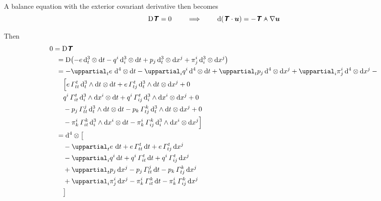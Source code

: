 \documentclass[\ifafour a4paper,12pt,\else a5paper,10pt,\fi%
onecolumn,oneside,article,%
british%
]{memoir}
\theoremstyle{remark}
\theoremstyle{innote}
\newcommand*{\mathte}[1]{\textbf{\textit{\textsf{#1}}}}
\newcommand*{\de}{\uppartial}%
\newcommand*{\di}{\mathrm{d}}%
\newcommand*{\Di}{\mathrm{D}}%
\renewcommand*{\|}[1][]{\nonscript\:#1\vert\nonscript\:\mathopen{}}
\newcommand*{\dand}{\mathbin{\mathclap{\mkern12.5mu\bm{\cdot}}\wedge}}
\newcommand*{\si}[1]{\di{#1}}
\newcommand*{\ttti}[1]{\di^{3}_{#1}}
\newcommand*{\tttti}[1]{\di^{4}_{#1}}
\newcommand*{\yT}{\mathte{T}}
\newcommand*{\yu}{\bm{u}}
\begin{document}
A balance equation with the exterior covariant derivative then becomes
\begin{equation}
  \label{eq:balance_contracted}
\Di\yT = 0 \qquad\implies\qquad
  \di(\yT \cdot \yu) = -\yT \dand \nabla\yu
\end{equation}

Then
\begin{equation}
  \label{eq:div_T31}
  \begin{aligned}
    &0=\Di\yT
    \\
    &\quad{}= \Di\bigl(
    -e\, \ttti{t}\otimes\si{t}
    -q^{i}\, \ttti{i}\otimes\si{t}
    +p_{j}\, \ttti{t}\otimes\si{x^{j}}
    +\pi^{i}_{j}\, \ttti{i}\otimes\si{x^{j}}
    \bigr)
    \\
    &\quad{}=
    -\de_{t}e\ \tttti{}\otimes\si{t}
    -\de_{i}q^{i}\, \tttti{}\otimes\si{t}
    +\de_{t}p_{j}\, \tttti{}\otimes\si{x^{j}}
    +\de_{i}\pi^{i}_{j}\, \tttti{}\otimes\si{x^{j}}
    -{}
    \\
    &\qquad
    \Bigl[
    e\,\varGamma^{t}_{tt}\, \ttti{t}\land\si{t} \otimes \si{t}
    +e\,\varGamma^{t}_{tj}\, \ttti{t}\land\si{t} \otimes \si{x^{j}}
    + 0
    \\
    &\qquad
    q^{i}\, \varGamma^{t}_{it}\, \ttti{i}\land\si{x^{i}} \otimes \si{t}
    +q^{i}\,\varGamma^{t}_{ij}\, \ttti{i}\land\si{x^{i}} \otimes \si{x^{j}}
    + 0
    \\
    &\qquad
    {}-p_{j}\, \varGamma^{j}_{tt}\, \ttti{t}\land\si{t} \otimes \si{t}
    -p_{k}\,\varGamma^{k}_{tj}\, \ttti{t}\land\si{t} \otimes \si{x^{j}}
    + 0
    \\
    &\qquad
    {}-\pi^{i}_{k}\, \varGamma^{k}_{it}\, \ttti{i}\land\si{x^{i}} \otimes \si{t}
    -\pi^{i}_{k}\,\varGamma^{k}_{ij}\, \ttti{i}\land\si{x^{i}} \otimes \si{x^{j}}
    \Bigr]
    \\
    &\quad{}=
    \tttti{}\otimes \bigl[{}
    \\
    &\qquad
    -\de_{t}e\ \si{t} 
    + e\,\varGamma^{t}_{tt}\, \si{t}
    +e\,\varGamma^{t}_{tj}\,  \si{x^{j}}
    \\
    &\qquad
    {}-\de_{i}q^{i}\, \si{t} 
    +q^{i}\, \varGamma^{t}_{it}\,  \si{t}
    +q^{i}\,\varGamma^{t}_{ij}\,  \si{x^{j}}
    \\
    &\qquad
    {}+\de_{t}p_{j}\, \si{x^{j}} 
    -p_{j}\, \varGamma^{j}_{tt}\, \si{t}
    -p_{k}\,\varGamma^{k}_{tj}\,  \si{x^{j}}
    \\
    &\qquad
    {}+\de_{i}\pi^{i}_{j}\, \si{x^{j}} 
    -\pi^{i}_{k}\, \varGamma^{k}_{it}\, \si{t}
    -\pi^{i}_{k}\,\varGamma^{k}_{ij}\, \si{x^{j}}
    \\
    &\qquad{}\bigr]
  \end{aligned}
\end{equation}
\end{document}
